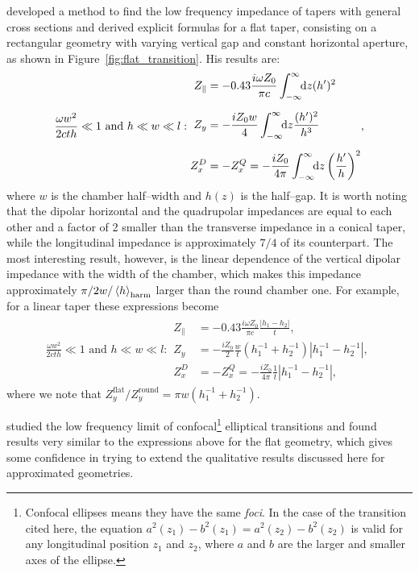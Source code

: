      developed a method to find the low frequency impedance of tapers with general cross sections and derived explicit formulas for a flat taper, consisting on a rectangular geometry with varying vertical gap and constant horizontal aperture, as shown in Figure~\ref{fig:flat_transition}. His results are:
    \begin{subequations}\label{eq:flat_transitions}
        \begin{align}
            \frac{\omega w^2}{2cth}\ll1\,\,\text{and}\,\,h\ll w\ll l:
            \begin{aligned}
                Z_\parallel &= -0.43\frac{i \omega Z_0}{\pi c}\infint{z}{(h')^2}\\[2mm]
                Z_y &= -\frac{i Z_0w}{4}\infint{z}{\frac{(h')^2}{h^3}}\\[2mm]
                Z_x^D&= -Z_x^Q= -\frac{i Z_0}{4\pi}\infint{z}{\fof{\frac{h'}{h}}^2}
            \end{aligned},
        \end{align}
    \end{subequations}
    where $w$ is the chamber half--width and $h(z)$ is the half--gap. It is worth noting that the dipolar horizontal and the quadrupolar impedances are equal to each other and a factor of 2 smaller than the transverse impedance in a conical taper, while the longitudinal impedance is approximately $7/4$ of its counterpart. The most interesting result, however, is the linear dependence of the vertical dipolar impedance with the width of the chamber, which makes this impedance approximately $\pi/2w/\average[\text{harm}]{h}$ larger than the round chamber one. For example, for a linear taper these expressions become
    \begin{align}
        \frac{\omega w^2}{2cth}\ll1\,\,\text{and}\,\,h\ll w\ll l:
        \begin{aligned}
        Z_\parallel &= -0.43\frac{i \omega Z_0}{\pi c}\frac{|h_1-h_2|}{t},\\[2mm]
        Z_y &= -\frac{i Z_0}{2}\frac{w}{t}(h_1^{-1}+h_2^{-1})|h_1^{-1}-h_2^{-1}|,\\[2mm]
        Z_x^D&= -Z_x^Q= -\frac{i Z_0}{4\pi}\frac1t|h_1^{-1}-h_2^{-1}|,
        \end{aligned}
    \end{align}
    where we note that $Z_y^\text{flat}/Z_y^\text{round} = \pi w(h_1^{-1}+h_2^{-1})$.

     studied the low frequency limit of confocal\footnote{Confocal ellipses means they have the same \emph{foci}. In the case of the transition cited here, the equation $a^2(z_1)-b^2(z_1)=a^2(z_2)-b^2(z_2)$ is valid for any longitudinal position $z_1$ and $z_2$, where $a$ and $b$ are the larger and smaller axes of the ellipse.} elliptical transitions and found results very similar to the expressions above for the flat geometry, which gives some confidence in trying to extend the qualitative results discussed here for approximated geometries.

